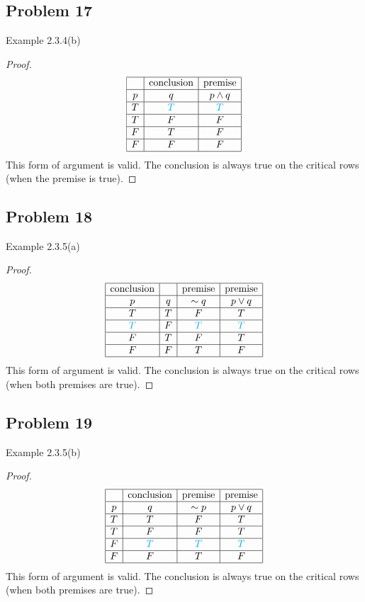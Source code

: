 \documentclass[14pt]{extarticle}
\begin{document}
\subsection{Problem 17}
Example 2.3.4(b)

\begin{proof}
$$
\begin{array}{|c|c|c|}
\hline
& \text{conclusion} & \text{premise} \\
\hline
p & q & p \wedge q \\
\hline
T & \color{cyan} T & \color{cyan} T \\
\hline
T & F & F \\
\hline
F & T & F \\
\hline
F & F & F \\
\hline
\end{array}
$$
This form of argument is valid. The conclusion is always true on the critical
rows (when the premise is true).
\end{proof}

\subsection{Problem 18}
Example 2.3.5(a)

\begin{proof}
$$
\begin{array}{|c|c|c|c|}
\hline
\text{conclusion} & & \text{premise} & \text{premise} \\
\hline
p & q & {\sim q} & p \vee q \\
\hline
T & T & F & T \\
\hline
\color{cyan} T & F & \color{cyan} T & \color{cyan} T \\
\hline
F & T & F & T \\
\hline
F & F & T & F \\
\hline
\end{array}
$$
This form of argument is valid. The conclusion is always true on the critical
rows (when both premises are true).
\end{proof}

\subsection{Problem 19}
Example 2.3.5(b)

\begin{proof}
$$
\begin{array}{|c|c|c|c|}
\hline
 & \text{conclusion} & \text{premise} & \text{premise} \\
\hline
p & q & {\sim p} & p \vee q \\
\hline
T & T & F & T \\
\hline
T & F & F & T \\
\hline
F & \color{cyan} T & \color{cyan} T & \color{cyan} T \\
\hline
F & F & T & F \\
\hline
\end{array}
$$
This form of argument is valid. The conclusion is always true on the critical
rows (when both premises are true).
\end{proof}
\end{document}
